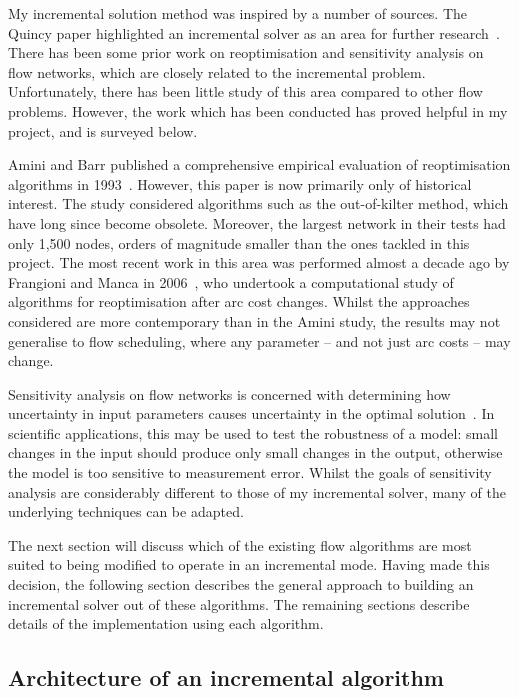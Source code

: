 My incremental solution method was inspired by a number of sources. The Quincy paper highlighted an incremental solver as an area for further research~\cite[\S6.5]{Isard:2007}. There has been some prior work on reoptimisation and sensitivity analysis on flow networks, which are closely related to the incremental problem. Unfortunately, there has been little study of this area compared to other flow problems. However, the work which has been conducted has proved helpful in my project, and is surveyed below.

Amini and Barr published a comprehensive empirical evaluation of reoptimisation algorithms in 1993~\cite{Amini:1993}. However, this paper is now primarily only of historical interest. The study considered algorithms such as the out-of-kilter method, which have long since become obsolete. Moreover, the largest network in their tests had only 1,500 nodes, orders of magnitude smaller than the ones tackled in this project. The most recent work in this area was performed almost a decade ago by Frangioni and Manca in 2006~\cite{Frangioni:2006}, who undertook a computational study of algorithms for reoptimisation after arc cost changes. Whilst the approaches considered are more contemporary than in the Amini study, the results may not generalise to flow scheduling, where any parameter -- and not just arc costs -- may change. 

Sensitivity analysis on flow networks is concerned with determining how uncertainty in input parameters causes uncertainty in the optimal solution~\cite[\S9.11]{Ahuja:1993}. In scientific applications, this may be used to test the robustness of a model: small changes in the input should produce only small changes in the output, otherwise the model is too sensitive to measurement error. Whilst the goals of sensitivity analysis are considerably different to those of my incremental solver, many of the underlying techniques can be adapted.

The next section will discuss which of the existing flow algorithms are most suited to being modified to operate in an incremental mode. Having made this decision, the following section describes the general approach to building an incremental solver out of these algorithms. The remaining sections describe details of the implementation using each algorithm.

\subsection{Architecture of an incremental algorithm}

